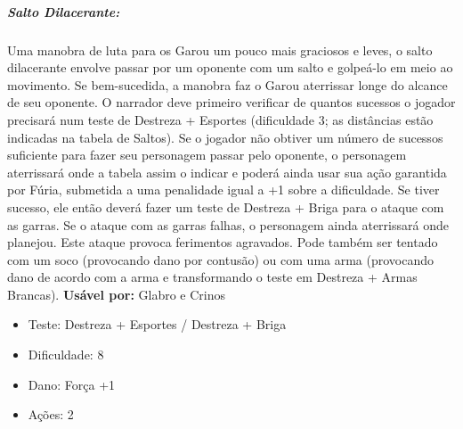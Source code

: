 \subparagraph{\bf Salto Dilacerante:}
Uma manobra de luta para os Garou um pouco mais graciosos e leves, o salto dilacerante envolve passar por um oponente com um salto e golpeá-lo em meio ao movimento. Se bem-sucedida, a manobra faz o Garou aterrissar longe do alcance de seu oponente. 
O narrador deve primeiro verificar de quantos sucessos o jogador precisará num teste de Destreza + Esportes (dificuldade 3; as distâncias estão indicadas na tabela de Saltos). Se o jogador não obtiver um número de sucessos suficiente para fazer seu personagem passar pelo oponente, o personagem aterrissará onde a tabela assim o indicar e poderá ainda usar sua ação garantida por Fúria, submetida a uma penalidade igual a +1 sobre a dificuldade. Se tiver sucesso, ele então deverá fazer um teste de Destreza + Briga para o ataque com as garras. Se o ataque com as garras falhas, o personagem ainda aterrissará onde planejou. 
Este ataque provoca ferimentos agravados. Pode também ser tentado com um soco (provocando dano por contusão) ou com uma arma (provocando dano de acordo com a arma e transformando o teste em Destreza + Armas Brancas).
{\bf Usável por:} Glabro e Crinos
\begin{itemize}[noitemsep]
\item Teste: Destreza + Esportes / Destreza + Briga
\item Dificuldade: 8
\item Dano: Força +1
\item Ações: 2
\end{itemize}